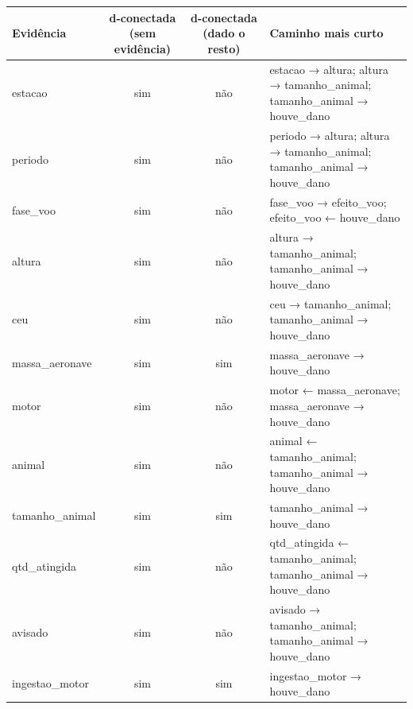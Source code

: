 \begin{tabular}{lccp{6.4cm}}
\toprule
Evidência & d-conectada (sem evidência) & d-conectada (dado o resto) & Caminho mais curto \\
\midrule
estacao & sim & não & estacao → altura; altura → tamanho\_animal; tamanho\_animal → houve\_dano \\
periodo & sim & não & periodo → altura; altura → tamanho\_animal; tamanho\_animal → houve\_dano \\
fase\_voo & sim & não & fase\_voo → efeito\_voo; efeito\_voo ← houve\_dano \\
altura & sim & não & altura → tamanho\_animal; tamanho\_animal → houve\_dano \\
ceu & sim & não & ceu → tamanho\_animal; tamanho\_animal → houve\_dano \\
massa\_aeronave & sim & sim & massa\_aeronave → houve\_dano \\
motor & sim & não & motor ← massa\_aeronave; massa\_aeronave → houve\_dano \\
animal & sim & não & animal ← tamanho\_animal; tamanho\_animal → houve\_dano \\
tamanho\_animal & sim & sim & tamanho\_animal → houve\_dano \\
qtd\_atingida & sim & não & qtd\_atingida ← tamanho\_animal; tamanho\_animal → houve\_dano \\
avisado & sim & não & avisado → tamanho\_animal; tamanho\_animal → houve\_dano \\
ingestao\_motor & sim & sim & ingestao\_motor → houve\_dano \\
\bottomrule
\end{tabular}

